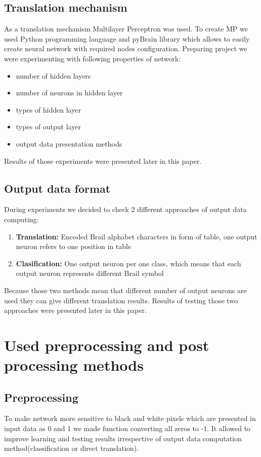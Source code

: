 \documentclass[a4paper]{article}
\begin{document}
\subsection{Translation mechanism}
As a translation mechanism Multilayer Perceptron was used. To create MP we used Python programming language and pyBrain library which allows to easily create neural network with required nodes configuration.
Preparing project we were experimenting with following properties of network:
\begin{itemize}
	\item number of hidden layers
	\item number of neurons in hidden layer
	\item types of hidden layer
	\item types of output layer
	\item output data presentation methods
\end{itemize}
Results of those experiments were presented later in this paper.

\subsection{Output data format}
During experiments we decided to check 2 different approaches of output data computing:
\begin{enumerate}
	\item \textbf{Translation:} Encoded Brail alphabet characters in form of table, one output neuron refers to one position in table 
	\item \textbf{Clasification:} One output neuron per one class, which means that each output neuron represents different Brail symbol
\end{enumerate}
Because those two methods mean that different number of output neurons are used they can give different translation results.
Results of testing those two approaches were presented later in this paper.

\section{Used preprocessing and post processing methods}
\subsection{Preprocessing} 
To make network more sensitive to black and white pixels which are presented in input data as 0 and 1 we made function converting all zeros to -1.
It allowed to improve learning and testing results irrespective of output data computation method(classification or direct translation).
\end{document}
